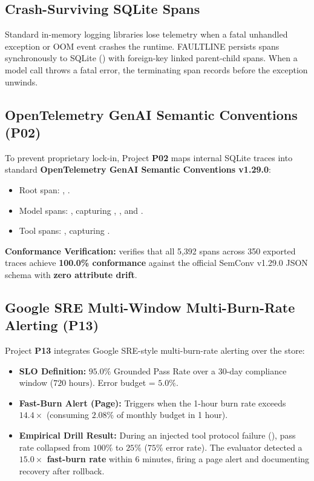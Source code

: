 \subsection{Crash-Surviving SQLite Spans}
Standard in-memory logging libraries lose telemetry when a fatal unhandled exception or OOM event crashes the runtime. FAULTLINE persists spans synchronously to SQLite () with foreign-key linked parent-child spans. When a model call throws a fatal error, the terminating span records  before the exception unwinds.

\subsection{OpenTelemetry GenAI Semantic Conventions (P02)}
To prevent proprietary lock-in, Project \textbf{P02} maps internal SQLite traces into standard \textbf{OpenTelemetry GenAI Semantic Conventions v1.29.0}:
\begin{itemize}
    \item Root span: , .
    \item Model spans: , capturing , , and .
    \item Tool spans: , capturing .
\end{itemize}
\textbf{Conformance Verification:}  verifies that all 5,392 spans across 350 exported traces achieve \textbf{100.0\% conformance} against the official SemConv v1.29.0 JSON schema with \textbf{zero attribute drift}.

\subsection{Google SRE Multi-Window Multi-Burn-Rate Alerting (P13)}
Project \textbf{P13} integrates Google SRE-style multi-burn-rate alerting over the  store:
\begin{itemize}
    \item \textbf{SLO Definition:} $95.0\%$ Grounded Pass Rate over a 30-day compliance window ($720\text{ hours}$). Error budget = $5.0\%$.
    \item \textbf{Fast-Burn Alert (Page):} Triggers when the 1-hour burn rate exceeds $14.4\times$ (consuming $2.08\%$ of monthly budget in 1 hour).
    \item \textbf{Empirical Drill Result:} During an injected tool protocol failure (), pass rate collapsed from $100\%$ to $25\%$ ($75\%$ error rate). The evaluator detected a \textbf{$15.0\times$ fast-burn rate} within 6 minutes, firing a page alert and documenting recovery after rollback.
\end{itemize}

